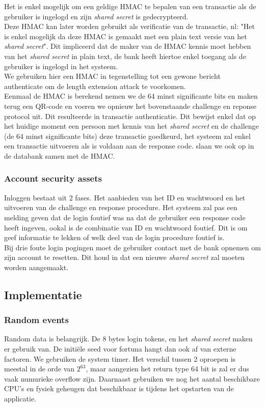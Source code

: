 \documentclass[11pt]{article}
\begin{document}
Het is enkel mogelijk om een geldige HMAC te bepalen van een transactie als de gebruiker is ingelogd en zijn \emph{shared secret} is gedecrypteerd.\\

Deze HMAC kan later worden gebruikt als verificatie van de transactie, nl: "Het is enkel mogelijk da deze HMAC is gemaakt met een plain text versie van het \emph{shared secret}". Dit impliceerd dat de maker van de HMAC kennis moet hebben van het \emph{shared secret} in plain text, de bank heeft hiertoe enkel toegang als de gebruiker is ingelogd in het systeem.\\


We gebruiken hier een HMAC in tegenstelling tot een gewone bericht authenticate om de length extension attack te voorkomen.\\

Eenmaal de HMAC is berekend nemen we de 64 minst significante bits en maken terug een QR-code en voeren we opnieuw het bovenstaande challenge en reponse protocol uit. Dit resulteerde in transactie authenticatie. Dit bewijst enkel dat op het huidige moment een persoon met kennis van het \emph{shared secret} en de challenge (de 64 minst significante bits) deze transactie goedkeurd, het systeem zal enkel een transactie uitvoeren als is voldaan aan de response code. slaan we ook op in de databank samen met de HMAC.
\subsubsection{Account security assets}
Inloggen bestaat uit 2 fases. Het aanbieden van het ID en wachtwoord en het uitvoeren van de challenge en response procedure. Het systeem zal pas een melding geven dat de login foutief was na dat de gebruiker een response code heeft ingeven, ookal is de combinatie van ID en wachtwoord foutief. Dit is om geef informatie te lekken of welk deel van de login procedure foutief is.\\

Bij drie foute login pogingen moet de gebruiker contact met de bank opnemen om zijn account te resetten. Dit houd in dat een nieuwe \emph{shared secret} zal moeten worden aangemaakt.
\subsection{Implementatie}
\subsubsection{Random events}
Random data is belangrijk. De 8 bytes login tokens, en het \emph{shared secret} maken er gebruik van.
De initi\"ele seed voor fortuna hangt dan ook af van externe factoren. We gebruiken de system timer. Het verschil tussen 2 oproepen is meestal in de orde van $2^63$, maar aangezien het return type 64 bit is zal er dus vaak numurieke overflow zijn. Daarnaast gebruiken we nog het aantal beschikbare CPU's en fysiek geheugen dat beschikbaar is tijdens het opstarten van de applicatie.
\end{document}
